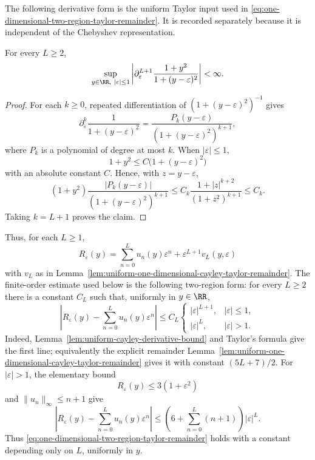 The following derivative form is the uniform Taylor input used in
\eqref{eq:one-dimensional-two-region-taylor-remainder}.  It is recorded
separately because it is independent of the Chebyshev representation.

\begin{lemma}%
\label{lem:uniform-cayley-derivative-bound}
For every \(L\ge2\),
\[
\sup_{y\in\RR,\ |\varepsilon|\le1}
\left|
\partial_\varepsilon^{L+1}
\frac{1+y^2}{1+(y-\varepsilon)^2}
\right|<\infty .
\]
\end{lemma}

\begin{proof}
For each \(k\ge0\), repeated differentiation of
\((1+(y-\varepsilon)^2)^{-1}\) gives
\[
\partial_\varepsilon^k
\frac{1}{1+(y-\varepsilon)^2}
=
\frac{P_k(y-\varepsilon)}
{(1+(y-\varepsilon)^2)^{k+1}},
\]
where \(P_k\) is a polynomial of degree at most \(k\).  When
\(|\varepsilon|\le1\),
\[
1+y^2\le C\bigl(1+(y-\varepsilon)^2\bigr)
\]
with an absolute constant \(C\).  Hence, with \(z=y-\varepsilon\),
\[
(1+y^2)
\frac{|P_k(y-\varepsilon)|}{(1+(y-\varepsilon)^2)^{k+1}}
\le
C_k\frac{1+|z|^{k+2}}{(1+z^2)^{k+1}}
\le C_k .
\]
Taking \(k=L+1\) proves the claim.
\end{proof}

Thus, for each \(L\ge1\),
\[
R_\varepsilon(y)=\sum_{n=0}^{L}u_n(y)\varepsilon^n
 +\varepsilon^{L+1}v_L(y,\varepsilon)
\]
with \(v_L\) as in
Lemma~\ref{lem:uniform-one-dimensional-cayley-taylor-remainder}.  The
finite-order estimate used below is the
following two-region form: for every \(L\ge2\) there is a constant \(C_L\)
such that, uniformly in \(y\in\RR\),
\begin{equation}\label{eq:one-dimensional-two-region-taylor-remainder}
\left|R_\varepsilon(y)-\sum_{n=0}^{L}u_n(y)\varepsilon^n\right|
\le C_L
\begin{cases}
|\varepsilon|^{L+1},& |\varepsilon|\le1,\\
|\varepsilon|^L,& |\varepsilon|>1.
\end{cases}
\end{equation}
Indeed, Lemma~\ref{lem:uniform-cayley-derivative-bound} and Taylor's formula
give the first line; equivalently the explicit remainder
Lemma~\ref{lem:uniform-one-dimensional-cayley-taylor-remainder}
gives it with constant \((5L+7)/2\).  For
\(|\varepsilon|>1\), the elementary bound
\[
R_\varepsilon(y)\le3(1+\varepsilon^2)
\]
and \(\|u_n\|_\infty\le n+1\) give
\[
\left|R_\varepsilon(y)-\sum_{n=0}^{L}u_n(y)\varepsilon^n\right|
\le
\left(6+\sum_{n=0}^{L}(n+1)\right)|\varepsilon|^L .
\]
Thus \eqref{eq:one-dimensional-two-region-taylor-remainder} holds with a
constant depending only on \(L\), uniformly in \(y\).

